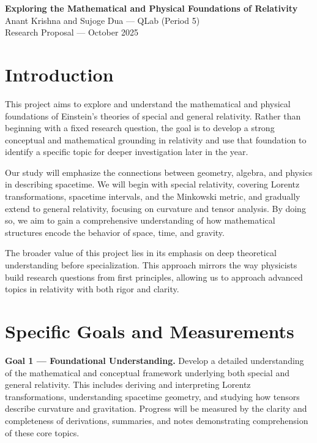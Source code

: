 \documentclass[12pt]{article}
\begin{document}
\begin{center}
    {\LARGE \bfseries Exploring the Mathematical and Physical Foundations of Relativity} \\[0.4em]
    {\normalsize Anant Krishna and Sujoge Dua — QLab (Period 5)} \\[0.25em]
    {\small Research Proposal — October 2025}
\end{center}

\vspace{1em}

\section*{Introduction}

This project aims to explore and understand the mathematical and physical foundations of Einstein’s theories of special and general relativity. Rather than beginning with a fixed research question, the goal is to develop a strong conceptual and mathematical grounding in relativity and use that foundation to identify a specific topic for deeper investigation later in the year. 

Our study will emphasize the connections between geometry, algebra, and physics in describing spacetime. We will begin with special relativity, covering Lorentz transformations, spacetime intervals, and the Minkowski metric, and gradually extend to general relativity, focusing on curvature and tensor analysis. By doing so, we aim to gain a comprehensive understanding of how mathematical structures encode the behavior of space, time, and gravity.

The broader value of this project lies in its emphasis on deep theoretical understanding before specialization. This approach mirrors the way physicists build research questions from first principles, allowing us to approach advanced topics in relativity with both rigor and clarity.

\section*{Specific Goals and Measurements}

\textbf{Goal 1 — Foundational Understanding.}  
Develop a detailed understanding of the mathematical and conceptual framework underlying both special and general relativity. This includes deriving and interpreting Lorentz transformations, understanding spacetime geometry, and studying how tensors describe curvature and gravitation. Progress will be measured by the clarity and completeness of derivations, summaries, and notes demonstrating comprehension of these core topics.
\end{document}
